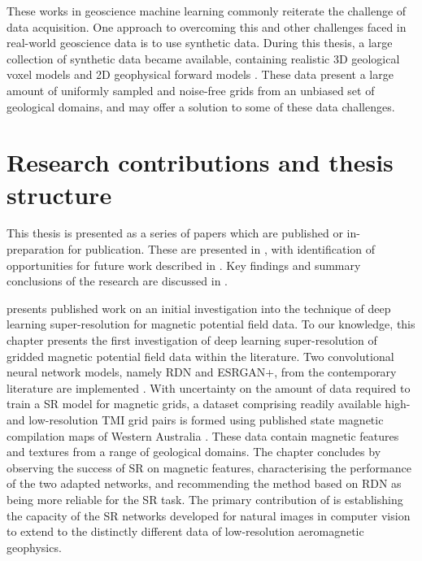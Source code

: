 These works in geoscience machine learning commonly reiterate the challenge of data acquisition.
One approach to overcoming this and other challenges faced in real-world geoscience data is to use synthetic data.
During this thesis, a large collection of synthetic data became available, containing realistic 3D geological voxel models and 2D geophysical forward models \parencite{jessellNoddyverseMassiveData2022}.
These data present a large amount of uniformly sampled and noise-free grids from an unbiased set of geological domains, and may offer a solution to some of these data challenges.

\section{Research contributions and thesis structure}
This thesis is presented as a series of papers which are published or in-preparation for publication.
These are presented in , with identification of opportunities for future work described in .
Key findings and summary conclusions of the research are discussed in .

 presents published work on an initial investigation into the technique of deep learning super-resolution for magnetic potential field data.
To our knowledge, this chapter presents the first investigation of deep learning super-resolution of gridded magnetic potential field data within the literature.
Two convolutional neural network models, namely RDN and ESRGAN+, from the contemporary literature are implemented \parencite{zhangResidualDenseNetwork2018,limEnhancedDeepResidual2017}.
With uncertainty on the amount of data required to train a SR model for magnetic grids, a dataset comprising readily available high- and low-resolution TMI grid pairs is formed using published state magnetic compilation maps of Western Australia \parencite{brett20MagneticMerged2020}.
These data contain magnetic features and textures from a range of geological domains.
The chapter concludes by observing the success of SR on magnetic features, characterising the performance of the two adapted networks, and recommending the method based on RDN as being more reliable for the SR task.
The primary contribution of  is establishing the capacity of the SR networks developed for natural images in computer vision to extend to the distinctly different data of low-resolution aeromagnetic geophysics.

